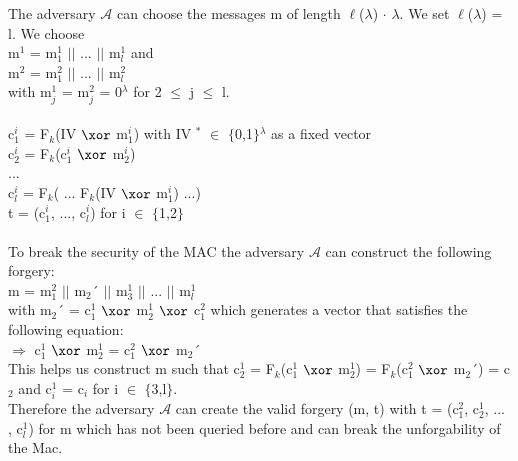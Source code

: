 \begin{itemize}
The adversary \(\mathcal{A}\) can choose the messages m of length \(\ell\)(\(\lambda\)) \(\cdot\) \(\lambda\). We set \(\ell\)(\(\lambda\)) = l. We choose \\
m\(^{1}\) = m\(_{1}^{1}\) \(\vert \vert\) ...  \(\vert \vert\)  m\(_{l}^{1}\) and\\ 
m\(^{2}\) = m\(_{1}^{2}\) \(\vert \vert\) ...  \(\vert \vert\)  m\(_{l}^{2}\) \\
with m\(_{j}^{1}\) = m\(_{j}^{2}\) =  0\(^{\lambda}\) for 2 \(\leq\) j \(\leq\) l.\\
\\
c\(_{1}^{i}\) = F\(_{k}\)(IV \(\xor\) m\(_{1}^{i}\)) with IV \(^{*}\) \(\in\) \(\{\)0,1\(\}\)\(^{\lambda}\) as a fixed vector \\
c\(_{2}^{i}\) = F\(_{k}\)(c\(_{1}^{i}\) \(\xor\) m\(_{2}^{i}\))\\
... \\
c\(_{l}^{i}\) = F\(_{k}\)( ... F\(_{k}\)(IV \(\xor\) m\(_{1}^{i}\)) ...) \\
t = (c\(_{1}^{i}\), ..., c\(_{l}^{i}\)) for i \(\in\) \(\{\)1,2\(\}\) \\
\\
To break the security of the MAC the adversary \(\mathcal{A}\) can construct the following forgery: \\
m =  m\(_{1}^{2}\) \(\vert \vert\) m\(_{2}\)´ \(\vert \vert\) m\(_{3}^{1}\) \(\vert \vert\) ...  \(\vert \vert\) m\(_{l}^{1}\) \\
with m\(_{2}\)´ = c\(_{1}^{1}\) \(\xor\) m\(_{2}^{1}\) \(\xor\) c\(_{1}^{2}\) which generates a vector that satisfies the following equation:\\
\(\Rightarrow\) c\(_{1}^{1}\) \(\xor\) m\(_{2}^{1}\) = c\(_{1}^{2}\) \(\xor\) m\(_{2}\)´  \\
This helps us construct m such that c\(_{2}^{1}\) = F\(_{k}\)(c\(_{1}^{1}\) \(\xor\) m\(_{2}^{1}\)) = F\(_{k}\)(c\(_{1}^{2}\) \(\xor\) m\(_{2}\)´) = c\(_{2}\) and c\(_{i}^{1}\) = c\(_{i}\) for i \(\in\) \(\{\)3,l\(\}\).\\
Therefore the adversary \(\mathcal{A}\) can create the valid forgery (m, t) with t = (c\(_{1}^{2}\), c\(_{2}^{1}\), ... , c\(_{l}^{1}\)) for m which has not been queried before and can break the unforgability of the Mac.

\end{itemize}

